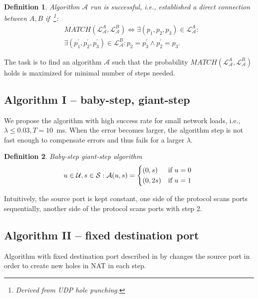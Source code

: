 \documentclass{llncs}
\newtheorem{mydef}{Definition}
\begin{document}
\begin{mydef}
\label{def:match}
Algorithm $\mathcal{A}$ run is successful, i.e., established a direct connection between $A,B$ if~\footnote{Derived from UDP hole punching.}:
\begin{align*}
& MATCH(\mathcal{L}^{A}_{\mathcal{A}}, \mathcal{L}^{B}_{\mathcal{A}}) \Leftrightarrow \exists(p_1, p_2, p_3) \in \mathcal{L}^{A}_{\mathcal{A}}: \\
& \exists(p_1^{\prime}, p_2^{\prime}, p_3^{\prime}) \in \mathcal{L}^{B}_{\mathcal{A}}: p_2 = p_3^{\prime} \wedge p_2^{\prime} = p_3.
%
\end{align*}
\end{mydef}
The task is to find an algorithm $\mathcal{A}$ such that the probability $MATCH(\mathcal{L}^{A}_{\mathcal{A}}, \mathcal{L}^{B}_{\mathcal{A}})$
holds is maximized for minimal number of steps needed.

\subsection{Algorithm I -- baby-step, giant-step}
We propose the algorithm with high success rate for small network loads, i.e.,
$\lambda \leq 0.03, T=10$~ms. When the error becomes larger, the
algorithm step is not fast enough to compensate errors and thus fails for a larger $\lambda$.

\begin{mydef}
Baby-step giant-step algorithm
\[
u \in \mathcal{U}, s \in \mathcal{S}: 
\mathcal{A}(u, s) = \begin{dcases*}
         (0, s)  & \text{if} $u=0$\\
         (0, 2s) & \text{if} $u=1$
        \end{dcases*}
\]
\end{mydef}

Intuitively, the source port is kept constant, one side of the protocol scans ports sequentially, another
side of the protocol scans ports with step 2.

\subsection{Algorithm II -- fixed destination port}
Algorithm with fixed destination port described in by \citep{Wang:2006:RSN:1156422.1156550}
changes the source port in order to create new holes in NAT in each step.
\end{document}
